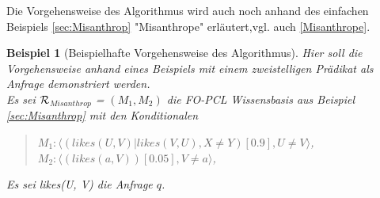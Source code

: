 \documentclass[a4paper, 11pt]{book}
\newtheorem{Bsp}{Beispiel}[section]
\begin{document}
{Die Vorgehensweise des Algorithmus wird auch noch anhand des einfachen Beispiels \ref{sec:Misanthrop} "{}Misanthrope"{} erläutert,vgl. auch \ref{Misanthrope}.
\begin{Bsp}[Beispielhafte Vorgehensweise des Algorithmus] Hier soll die \\ Vorgehensweise anhand eines Beispiels mit einem zweistelligen Prädikat als Anfrage demonstriert werden.\\
	Es sei  $ \cal{R} $$_{Misanthrop}  $ = $ (M_1, M_2)  $ die FO-PCL Wissensbasis aus Beispiel \ref{sec:Misanthrop} mit den Konditionalen 
	\begin{quote}
	$ M_{1}  :  \langle (likes(U, V)|likes(V, U), X \neq Y)[0.9], U \neq V \rangle $,\\
	$ M_{2}  :  \langle (likes(a, V))[0.05], V \neq a \rangle $,\\
	\end{quote}
	Es sei likes(U, V) die Anfrage $ q $.
		$$
\end{Bsp}}
\end{document}
